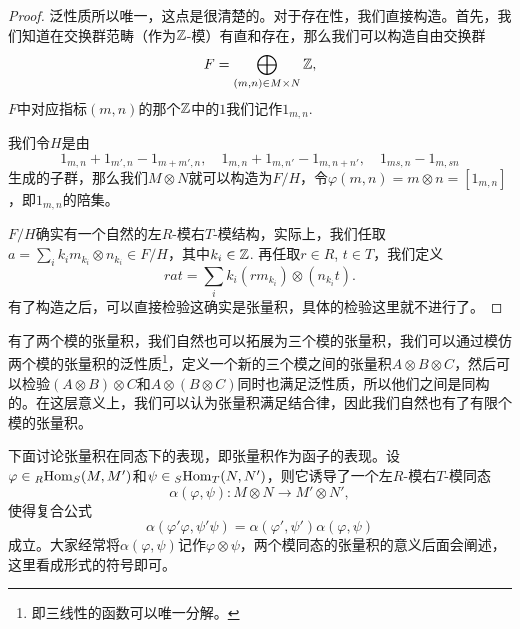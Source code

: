 \begin{proof} 


泛性质所以唯一，这点是很清楚的。对于存在性，我们直接构造。首先，我们知道在交换群范畴（作为$\mathbb{Z}$-模）有直和存在，那么我们可以构造自由交换群
\[
	F=\bigoplus_{(m,n)\in M\times N} \mathbb{Z},
\]
$F$中对应指标$(m,n)$的那个$\mathbb{Z}$中的$1$我们记作$1_{m,n}$. 

我们令$H$是由
\[
	1_{m,n}+1_{m',n}-1_{m+m',n},\quad 1_{m,n}+1_{m,n'}-1_{m,n+n'},\quad 1_{ms,n}-1_{m,sn}
\]
生成的子群，那么我们$M\otimes N$就可以构造为$F/H$，令$\varphi(m,n)=m\otimes n=[1_{m,n}]$，即$1_{m,n}$的陪集。

$F/H$确实有一个自然的左$R$-模右$T$-模结构，实际上，我们任取$a=\sum_{i}k_i m_{k_i}\otimes n_{k_i} \in F/H$，其中$k_i\in \mathbb{Z}$. 再任取$r\in R$, $t\in T$，我们定义
\[
	rat=\sum_{i}k_i (rm_{k_i})\otimes (n_{k_i}t).
\]
有了构造之后，可以直接检验这确实是张量积，具体的检验这里就不进行了。
\end{proof}

\para 有了两个模的张量积，我们自然也可以拓展为三个模的张量积，我们可以通过模仿两个模的张量积的泛性质\footnote{即三线性的函数可以唯一分解。}，定义一个新的三个模之间的张量积$A\otimes B\otimes C$，然后可以检验$(A\otimes B)\otimes C$和$A\otimes (B\otimes C)$同时也满足泛性质，所以他们之间是同构的。在这层意义上，我们可以认为张量积满足结合律，因此我们自然也有了有限个模的张量积。

\para 下面讨论张量积在同态下的表现，即张量积作为函子的表现。设$\varphi\in {}_R\!\operatorname{Hom}_S(M,M')$和$\psi\in {}_S\!\operatorname{Hom}_T(N,N')$，则它诱导了一个左$R$-模右$T$-模同态
\[
	\alpha(\varphi,\psi):M\otimes N\to M'\otimes N',
\]
使得复合公式
\[
	\alpha(\varphi'\varphi,\psi'\psi)=\alpha(\varphi',\psi')\alpha(\varphi,\psi)
\]
成立。大家经常将$\alpha(\varphi,\psi)$记作$\varphi\otimes \psi$，两个模同态的张量积的意义后面会阐述，这里看成形式的符号即可。

